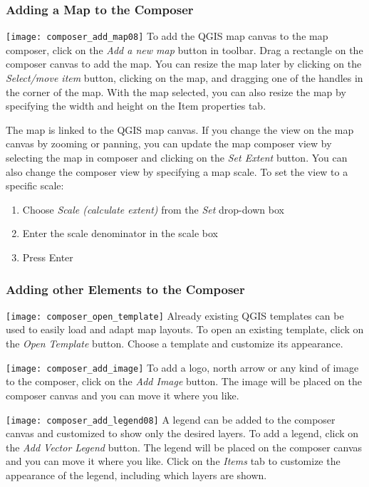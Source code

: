 \subsubsection{Adding a Map to the Composer}

\texttt{[image: composer\_add\_map08]} To add
the QGIS map canvas to the map composer, click on the \textit{Add a new
map} button in toolbar. Drag a rectangle on the composer canvas to add the
map. You can resize the map later by clicking on the \textit{Select/move item}
button, clicking on the map, and dragging one of the handles in the corner of
the map. With the map selected, you can also resize the map by specifying the
width and height on the Item properties tab.

The map is linked to the QGIS map canvas. If you change the view on the map
canvas by zooming or panning, you can update the map composer view by
selecting the map in composer and clicking on the \textit{Set Extent} button.
You can also change the composer view by specifying a map scale. To set the
view to a specific scale:

\begin{enumerate}
\item Choose \textit{Scale (calculate extent)} from the \textit{Set} drop-down
box
\item Enter the scale denominator in the scale box
\item Press Enter
\end{enumerate} 

\subsubsection{Adding other Elements to the Composer} 
 
\texttt{[image: composer\_open\_template]} Already existing QGIS templates 
can be used to easily load and adapt map layouts. To open an existing 
template, click on the \textit{Open Template} button. Choose a template and customize 
its appearance. 

\texttt{[image: composer\_add\_image]} To add a logo, north arrow or any 
kind of image to the composer, click on the \textit{Add Image} button. The image will 
be placed on the composer canvas and you can move it where you like. 

\texttt{[image: composer\_add\_legend08]} A
legend can be added to the composer canvas and customized to show only the
desired layers. To add a legend, click on the \textit{Add Vector Legend}
button. The legend will be placed on the composer canvas and you can move it
where you like. Click on the \textit{Items} tab to customize the appearance of
the legend, including which layers are shown.


